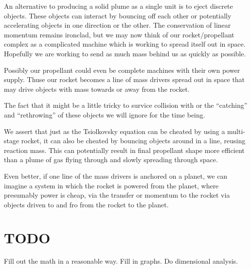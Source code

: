 \documentclass[11pt]{article}
\begin{document}
An alternative to producing a solid plume as a single unit is to eject discrete objects.
These objects can interact by bouncing off each other or potentially accelerating objects
in one direction or the other.  The conservation of linear momentum remains ironclad,
but we may now think of our rocket/propellant complex as a complicated machine which
is working to spread itself out in space. Hopefully we are working to send as much
mass behind us as quickly as possible.

Possibly our propellant could even be complete machines with their own power supply.
Thuse our rocket becomes a line of mass drivers spread out in space that may drive
objects with mass towards or away from the rocket.

The fact that it might be a little tricky to survice collision with or the ``catching'' and
``rethrowing'' of these objects we will ignore for the time being.

We assert that just as the Tsiolkovsky equation can be cheated by using a multi-stage
rocket, it can also be cheated by bouncing objects around in a line, reusing reaction mass.
This can potentially result in final propellant shape more efficient than a plume of
gas flying through and slowly spreading through space.

Even better, if one line of the mass drivers is anchored on a planet, we can
imagine a system in which the rocket is powered from the planet, where presumably power
is cheap, via the transfer or momentum to the rocket via objects driven to and fro from
the rocket to the planet.

\section{TODO}

Fill out the math in a reasonable way.  Fill in graphs. Do dimensional analysis.
\end{document}

